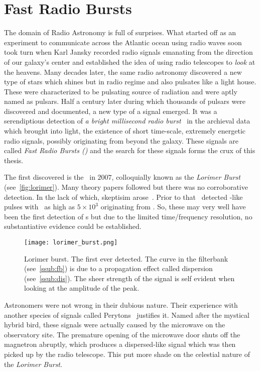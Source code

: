 \chapter{Fast Radio Bursts}\label{ch:frb}

\par The domain of Radio Astronomy is full of surprises. 
What started off as an experiment to communicate across the Atlantic ocean using radio waves soon took turn when Karl Jansky recorded radio signals emanating from the direction of our galaxy's center and established the idea of using radio telescopes to \emph{look} at the heavens.
Many decades later, the same radio astronomy discovered a new type of stars which shines but in radio regime and also pulsates like a light house. These were characterized to be pulsating source of radiation and were aptly named as pulsars.
Half a century later during which thousands of pulsars were discovered and documented, a new type of a signal emerged.
It was a serendiptious detection of \emph{a bright millisecond radio burst}~\cite{lorimerburst} in the archieval data which brought into light, the existence of short time-scale, extremely energetic radio signals, possibly originating from beyond the galaxy. 
These signals are called \emph{Fast Radio Bursts (\frb{})} and the search for these signals forms the crux of this thesis.

\par The first discovered \frb is the~\cite{lorimerburst} in $2007$, colloquially known as the \emph{Lorimer Burst} (see~\autoref{fig:lorimer}). 
Many theory papers followed but there was no corroborative detection. In the lack of which, skeptisim arose~\cite{burke_doubt}. 
Prior to that~\cite{old_m87_bursts} detected \frb-like pulses with \dm~as high as $5\times 10^3$ \pc originating from . So, these may very well have been the first detection of \frb s but due to the limited time/frequency resolution, no substantiative evidence could be established. 

\begin{figure}
	\centering
	\label{fig:lorimer}
	\texttt{[image: lorimer\_burst.png]}
	\caption{Lorimer burst. The first ever \frb{} detected. The curve in the filterbank (see~\autoref{ssub:fb}) is due to a propagation effect called dispersion (see~\autoref{ssub:dis}). The sheer strength of the signal is self evident when looking at the amplitude of the peak.}
\end{figure}

\par Astronomers were not wrong in their dubious nature. Their experience with another species of signals called Perytons~\cite{perytons} justifies it. Named after the mystical hybrid bird, these signals were actually caused by the microwave on the observatory site. The premature opening of the microwave door shuts off the magnetron abruptly, which produces a dispersed-like signal which was then picked up by the radio telescope.
This put more shade on the celestial nature of the \emph{Lorimer Burst}.

